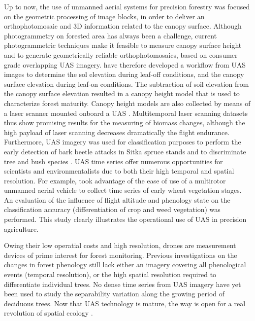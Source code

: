 \documentclass[remotesensing,article,submit,moreauthors,pdftex,12pt,a4paper]{mdpi} %
\begin{document}
Up to now, the use of unmanned aerial systems for precision forestry was focused on the geometric processing of image blocks, in order to deliver an orthophotomosaic and 3D information related to the canopy surface. 
Although photogrammetry on forested area has always been a challenge, current photogrammetric techniques make it feasible to measure canopy surface height and to generate geometrically reliable orthophotomosaics, based on consumer grade overlapping UAS imagery. 
\citeauthor{dandois_high_2013} \cite{dandois_high_2013} have therefore developed a workflow from UAS images to determine the sol elevation during leaf-off conditions, and the canopy surface elevation during leaf-on conditions. 
The subtraction of soil elevation from the canopy surface elevation resulted in a canopy height model that is used to characterize forest maturity. 
Canopy height models are also collected by means of a laser scanner mounted onboard a UAS \cite{jaakkola_low-cost_2010}. 
Multitemporal laser scanning datasets thus show promising results for the measuring of biomass changes, although the high payload of laser scanning decreases dramatically the flight endurance.
Furthermore, UAS imagery was used for classification purposes to perform the early detection of bark beetle attacks in Sitka spruce stands \cite{drauschke_towards_2014} and to discriminate tree and bush species \cite{gini_use_2014}. 
UAS time series offer numerous opportunities for scientists and environmentalists due to both their high temporal and spatial resolution. 
For example, \citeauthor{torres-sanchez_multitemporal_2014} \cite{torres-sanchez_multitemporal_2014} took advantage of the ease of use of a multirotor unmanned aerial vehicle to collect time series of early wheat vegetation stages. 
An evaluation of the influence of flight altitude and phenology state on the classification accuracy (differentiation of crop and weed vegetation) was performed. This study clearly illustrates the operational use of UAS in precision agriculture. 

Owing their low operatial costs and high resolution, drones are measurement devices of prime interest for forest monitoring.
Previous investigations on the changes in forest phenology still lack either an imagery covering all phenological events (temporal resolution), or the high spatial resolution required to differentiate individual trees.
No dense time series from UAS imagery have yet been used to study the separability variation along the growing period of deciduous trees.
Now that UAS technology is mature, the way is open for a real revolution of spatial ecology \cite{anderson_lightweight_2013}.
\end{document}
